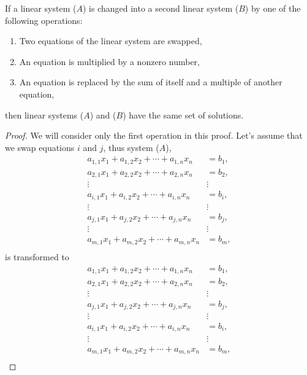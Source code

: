 \begin{theorem} \label{thm:gauss:method}
If a linear system ($A$) is changed into a second linear system ($B$) by one of the following operations:
\begin{enumerate}
\item Two equations of the linear system are swapped,
\item An equation is multiplied by a nonzero number,
\item An equation is replaced by the sum of itself and a multiple of another equation,
\end{enumerate}
then linear systems ($A$) and ($B$) have the same set of solutions.
\end{theorem}


\begin{proof}
We will consider only the first operation in this proof.  Let's assume that we swap equations $i$ and $j$, thus system ($A$),
\begin{align*}
a_{1,1} x_1 + a_{1,2} x_2 + \cdots + a_{1,n} x_n & = b_1 , \\
a_{2,1} x_1 + a_{2,2} x_2 + \cdots + a_{2,n} x_n & = b_2, \\
\vdots \qquad \qquad &  \vdots  \\
a_{i,1} x_1 + a_{i,2} x_2 + \cdots + a_{i,n} x_n & = b_i, \\
\vdots \qquad \qquad &  \vdots  \\
a_{j,1} x_1 + a_{j,2} x_2 + \cdots + a_{j,n} x_n & = b_j, \\
\vdots \qquad \qquad &  \vdots  \\
a_{m,1} x_1 + a_{m,2} x_2 + \cdots + a_{m,n} x_n & = b_m, \\
\end{align*}
is transformed to
\begin{align*}
a_{1,1} x_1 + a_{1,2} x_2 + \cdots + a_{1,n} x_n & = b_1 , \\
a_{2,1} x_1 + a_{2,2} x_2 + \cdots + a_{2,n} x_n & = b_2, \\
\vdots \qquad \qquad &  \vdots  \\
a_{j,1} x_1 + a_{j,2} x_2 + \cdots + a_{j,n} x_n & = b_j, \\
\vdots \qquad \qquad &  \vdots  \\
a_{i,1} x_1 + a_{i,2} x_2 + \cdots + a_{i,n} x_n & = b_i, \\
\vdots \qquad \qquad &  \vdots  \\
a_{m,1} x_1 + a_{m,2} x_2 + \cdots + a_{m,n} x_n & = b_m, \\
\end{align*}


\end{proof}
